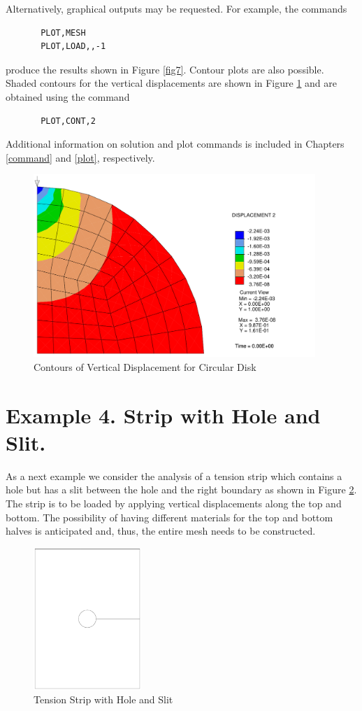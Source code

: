 Alternatively, graphical outputs may be requested.  For example, the
commands
\begin{verbatim}
       PLOT,MESH
       PLOT,LOAD,,-1
\end{verbatim}
produce the results shown in Figure \ref{fig7}.
Contour plots are also possible.
Shaded contours for the vertical displacements are shown in Figure \ref{fig8}
and are obtained using the command
\begin{verbatim}
       PLOT,CONT,2
\end{verbatim}
Additional information on solution and plot commands is included in
Chapters \ref{command} and \ref{plot}, respectively.

\begin{figure}
\centerline {\hfil \includegraphics[width=4.2in]{figs/fig5} \hfil}
\caption{Contours of Vertical Displacement for Circular Disk}
\label{fig8}
\end{figure}

\section{Example 4. Strip with Hole and Slit.}
\label{ex4}

As a next example we consider the analysis of a tension strip which
contains a hole but has a slit between the hole and the right boundary
as shown in Figure \ref{fig9}.  The strip is to be loaded by applying vertical
displacements along the top and bottom.  The possibility of having
different materials for the top and bottom halves is anticipated and,
thus, the entire mesh needs to be constructed.

\begin{figure}[ht!]
\centerline {\hfil \includegraphics[width=1.6in]{figs/figo3} \hfil}
\caption{Tension Strip with Hole and Slit}
\label{fig9}
\end{figure}

